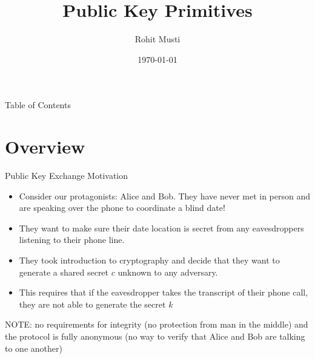 \documentclass[]{beamer}
\title{Public Key Primitives}
\author{Rohit Musti}
\institute{CUNY - Hunter College}
\date{\today}
\begin{document}
 
\frame{\titlepage}

\begin{frame}{Table of Contents}
  \tableofcontents
\end{frame}


\section{Overview}

\begin{frame}{Public Key Exchange Motivation}
    \begin{itemize}
        \item \pause Consider our protagonists: Alice and Bob. They have never met in person and are speaking over the phone to coordinate a blind date!
        \item \pause They want to make sure their date location is secret from any eavesdroppers listening to their phone line.
        \item \pause They took introduction to cryptography and decide that they want to generate a shared secret \(c\) unknown to any adversary.
        \item \pause This requires that if the eavesdropper takes the transcript of their phone call, they are not able to generate the secret \(k\) 
    \end{itemize}
    \pause NOTE: no requirements for integrity (no protection from man in the middle) and the protocol is fully anonymous (no way to verify that Alice and Bob are talking to one another)
\end{frame}
\end{document}
